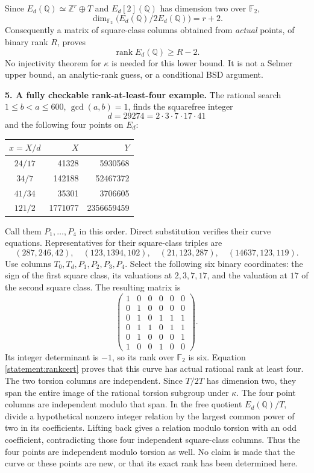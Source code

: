 \documentclass[11pt,a4paper]{article}
\newcommand{\Z}{\mathbb{Z}}
\newcommand{\Q}{\mathbb{Q}}
\numberwithin{equation}{section}
\begin{document}
Since $E_d(\Q)\simeq\Z^r\oplus T$ and $E_d[2](\Q)$ has dimension two over
$\mathbb F_2$,
\[
 \dim_{\mathbb F_2}\bigl(E_d(\Q)/2E_d(\Q)\bigr)=r+2.
\]
Consequently a matrix of square-class columns obtained from \emph{actual}
points, of binary rank $R$, proves
\begin{equation}\label{statement:rankcert}
 \operatorname{rank}E_d(\Q)\geq R-2.
\end{equation}
No injectivity theorem for $\kappa$ is needed for this lower bound. It is not
a Selmer upper bound, an analytic-rank guess, or a conditional BSD argument.

\medskip
\textbf{5. A fully checkable rank-at-least-four example.}
The rational search $1\leq b<a\leq600$, $\gcd(a,b)=1$, finds the squarefree
integer
\[
 d=29274=2\cdot3\cdot7\cdot17\cdot41
\]
and the following four points on $E_d$:
\begin{center}
\begin{tabular}{c|r|r}
$x=X/d$ & $X$ & $Y$\\\hline
$24/17$ & 41328 & 5930568\\
$34/7$ & 142188 & 52467372\\
$41/34$ & 35301 & 3706605\\
$121/2$ & 1771077 & 2356659459
\end{tabular}
\end{center}
Call them $P_1,\ldots,P_4$ in this order. Direct substitution verifies their
curve equations. Representatives for their square-class triples are
\[
 (287,246,42),\quad (123,1394,102),\quad
 (21,123,287),\quad (14637,123,119).
\]
Use columns $T_0,T_d,P_1,P_2,P_3,P_4$. Select the following six binary
coordinates: the sign of the first square class, its valuations at
$2,3,7,17$, and the valuation at $17$ of the second square class. The
resulting matrix is
\begin{equation}\label{statement:matrix}
 \begin{pmatrix}
 1&0&0&0&0&0\\
 0&1&0&0&0&0\\
 0&1&0&1&1&1\\
 0&1&1&0&1&1\\
 0&1&0&0&0&1\\
 1&0&0&1&0&0
 \end{pmatrix}.
\end{equation}
Its integer determinant is $-1$, so its rank over $\mathbb F_2$ is six.
Equation \eqref{statement:rankcert} proves that this curve has actual rational
rank at least four. The two torsion columns are independent. Since $T/2T$ has dimension two,
they span the entire image of the rational torsion subgroup under $\kappa$.
The four point columns are independent modulo that span. In the free
quotient $E_d(\Q)/T$, divide a hypothetical nonzero integer relation by
the largest common power of two in its coefficients. Lifting back gives a
relation modulo torsion with an odd coefficient, contradicting those four
independent square-class columns. Thus the four points are independent
modulo torsion as well. No claim is made that the curve or
these points are new, or that its exact rank has been determined here.
\end{document}
